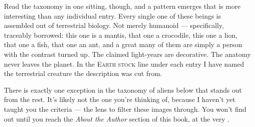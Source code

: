 Read the taxonomy in one sitting, though, and a pattern emerges that is more interesting than
any individual entry. Every single one of these beings is assembled out of terrestrial
biology. Not merely humanoid --- specifically, traceably borrowed: this one is a mantis, that
one a crocodile, this one a lion, that one a fish, that one an ant, and a great many of them
are simply a person with the contrast turned up. The claimed light-years are decorative. The
anatomy never leaves the planet. In the \textsc{Earth stock} line under each entry I have
named the terrestrial creature the description was cut from.

There is exactly one exception in the taxonomy of aliens below that stands out from the rest.
It's likely not the one you're thinking of, because I haven't yet taught you the criteria ---
the lens to filter these images through. You won't find out until you reach the
\emph{About the Author} section of this book, at the very .

\starfieldon
\rosterwide


